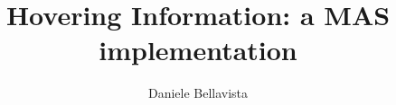 \documentclass[11pt]{article}
\newcommand{\xauth}{Daniele Bellavista}
\newcommand{\xtitle}{Hovering Information: a MAS implementation}
\begin{document}
\title{\xtitle}
\author{\xauth}

\maketitle





%


{}
\end{document}
